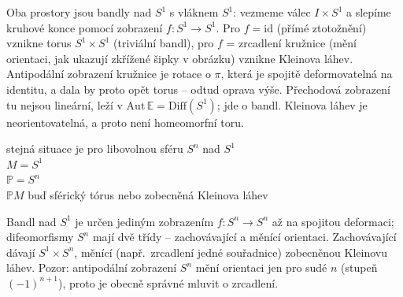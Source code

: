 \begin{vysvetleni}
Oba prostory jsou bandly nad $S^1$ s vláknem $S^1$: vezmeme válec $I\times S^1$ a slepíme kruhové konce pomocí zobrazení $f:S^1\to S^1$.
Pro $f=\mathrm{id}$ (přímé ztotožnění) vznikne torus $S^1\times S^1$ (triviální bandl), pro $f$ = zrcadlení kružnice (mění orientaci, jak ukazují
zkřížené šipky v obrázku) vznikne Kleinova láhev. Antipodální zobrazení kružnice je rotace o $\pi$, která je spojitě deformovatelná na identitu,
a dala by proto opět torus -- odtud oprava výše. Přechodová zobrazení tu nejsou lineární, leží v $\mathrm{Aut}\,\mathbb{E}=\mathrm{Diff}(S^1)$;
jde o  bandl. Kleinova láhev je neorientovatelná, a proto není homeomorfní toru.
\end{vysvetleni}

\begin{priklad}[Př]
stejná situace je pro libovolnou sféru $S^n$ nad $S^1$ \\
\quad $M = S^1$ \\
\quad $\mathbb{P} = S^n$ \\
$\mathbb{P}M$ buď sférický tórus nebo zobecněná Kleinova láhev
\end{priklad}

\begin{vysvetleni}
Bandl nad $S^1$ je určen jediným  zobrazením $f:S^n\to S^n$ až na spojitou deformaci; difeomorfismy $S^n$ mají dvě třídy -- zachovávající
a měnící orientaci. Zachovávající dávají $S^1\times S^n$, měnící (např.\ zrcadlení jedné souřadnice) zobecněnou Kleinovu láhev.
Pozor: antipodální zobrazení $S^n$ mění orientaci jen pro sudé $n$ (stupeň $(-1)^{n+1}$), proto je obecně správné mluvit o zrcadlení.
\end{vysvetleni}

